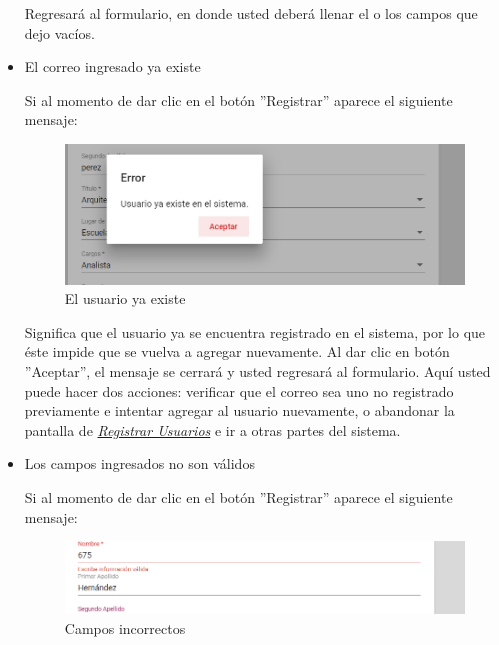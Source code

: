 \begin{itemize}
                         Regresará al formulario, en donde usted deberá llenar el o los campos que dejo vacíos.

                    \item El correo ingresado ya existe

                        Si al momento de dar clic en el botón ''Registrar'' aparece el siguiente mensaje:

                         \begin{figure}[!hbtp]
                        	\centering
                        \includegraphics[width=0.4\linewidth]{images/SP5/MSG36}
                        	\caption{El usuario ya existe}
                        	\label{mensaje36}

                        \end{figure}

                        Significa que el usuario ya se encuentra registrado en el sistema, por lo que éste impide que se vuelva a agregar nuevamente. Al dar clic en botón ''Aceptar'', el mensaje se cerrará y usted  regresará al formulario. Aquí usted puede hacer dos acciones: verificar que el correo sea uno no registrado previamente e intentar agregar al usuario nuevamente, o abandonar la pantalla de \hyperlink{registrarUs}{\textit{Registrar Usuarios}} e ir a otras partes del sistema.
                    \newpage
                    \item Los campos ingresados no son válidos

                        Si al momento de dar clic en el botón ''Registrar'' aparece el siguiente mensaje:
                         \begin{figure}[!hbtp]
                        	\centering
                        	\includegraphics[width=0.4\linewidth]{images/SP5/MSG35}
                        	\caption{Campos incorrectos}
                        	\label{mensaje35}

                        \end{figure}


\end{itemize}
